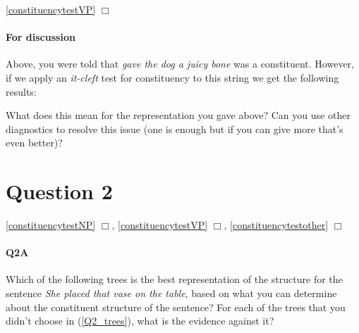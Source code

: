 \documentclass{article}
\begin{document}
\hfill{}\ref{constituencytestVP} $\Box$ %

\paragraph{For discussion} Above, you were told that \emph{gave the dog a juicy bone} was a constituent.
However, if we apply an \emph{it-cleft} test for constituency to this string we get the following results:
\begin{exe}
\end{exe}
What does this mean for the representation you gave above?
Can you use other diagnostics to resolve this issue (one is enough but if you can give more that's even better)?

\section*{Question 2}
\hfill{}
\ref{constituencytestNP} $\Box$,
\ref{constituencytestVP} $\Box$,
\ref{constituencytestother} $\Box$

\paragraph{Q2A }Which of the following trees is the best representation of the structure for the sentence \emph{She placed that vase on the table}, based on what you can determine about the constituent
structure of the sentence? For each of the trees that you didn't choose in (\ref{Q2_trees}), what is the evidence against it?
\end{document}
